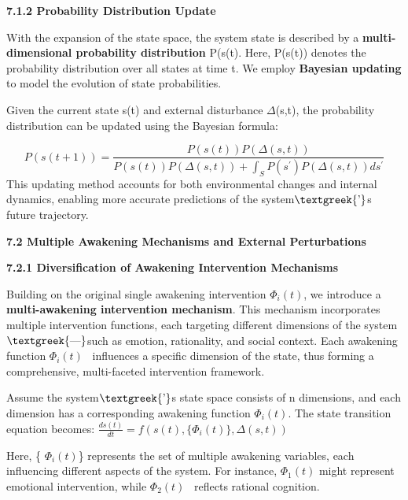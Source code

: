\documentclass[a4paper]{article}
\begin{document}
\textbf{7.1.2 Probability Distribution Update}

With the expansion of the state space, the system state is described by a \textbf{multi-dimensional probability
distribution} P(s(t). Here, P(s(t)) denotes the probability distribution over all states at time t. We employ
\textbf{Bayesian updating} to model the evolution of state probabilities.

Given the current state s(t) and external disturbance $\Delta $(s,t), the probability distribution can be updated using
the Bayesian formula:

\begin{equation*}
P\left(s\left(t+1\right)\right)=\frac{P\left(s\left(t\right)\right)P\left(\Delta
\left(s,t\right)\right)}{P\left(s\left(t\right)\right)P\left(\Delta \left(s,t\right)\right)+\int
_SP\left(s^{'}\right)P\left(\Delta \left(s,t\right)\right)ds^{'}}
\end{equation*}
This updating method accounts for both environmental changes and internal dynamics, enabling more accurate predictions
of the system$\text{\textgreek{’}}$s future trajectory.

\textbf{7.2 Multiple Awakening Mechanisms and External Perturbations}

\textbf{7.2.1 Diversification of Awakening Intervention Mechanisms}

Building on the original single awakening intervention  $\Phi _i\left(t\right)$, we introduce a \textbf{multi-awakening
intervention mechanism}. This mechanism incorporates multiple intervention functions, each targeting different
dimensions of the system$\text{\textgreek{—}}$such as emotion, rationality, and social context. Each awakening function
 $\Phi _i\left(t\right)$ \ influences a specific dimension of the state, thus forming a comprehensive, multi-faceted
intervention framework.

{\centering
Assume the system$\text{\textgreek{’}}$s state space consists of n dimensions, and each dimension has a corresponding
awakening function  $\Phi _i\left(t\right)$. The state transition equation becomes: 
$\frac{\mathit{ds}\left(t\right)}{\mathit{dt}}=f\left(s\left(t\right),\{\Phi _i\left(t\right)\},\Delta
\left(s,t\right)\right)$
\par}

Here, \{ $\Phi _i\left(t\right)$\} represents the set of multiple awakening variables, each influencing different
aspects of the system. For instance,  $\Phi _1\left(t\right)$ might represent emotional intervention, while  $\Phi
_2\left(t\right)$ \ reflects rational cognition.
\end{document}
